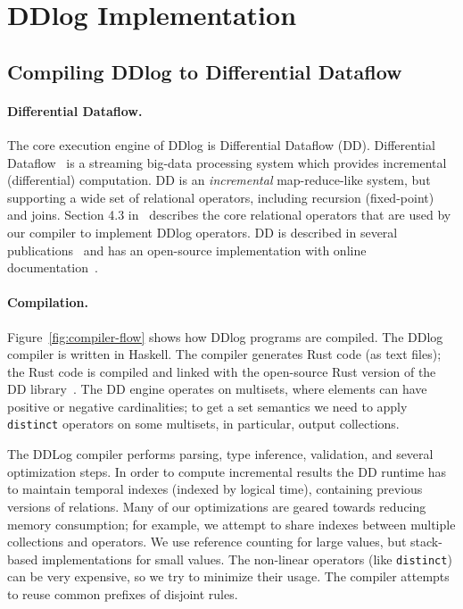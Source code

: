 \section{DDlog Implementation}\label{sec-system}

\subsection{Compiling DDlog to Differential Dataflow}

\paragraph{Differential Dataflow.}
The core execution engine of DDlog is Differential Dataflow (DD).
Differential Dataflow~\cite{differential-dataflow-paper} is a
streaming big-data processing system which provides incremental
(differential) computation.  DD is an \emph{incremental}
map-reduce-like system, but supporting a wide set of relational
operators, including recursion (fixed-point) and joins.  Section 4.3
in~\cite{differential-dataflow-paper} describes the core relational
operators that are used by our compiler to implement DDlog operators.
DD is described in several
publications~\cite{timely-dataflow,differential-dataflow-paper} and
has an open-source implementation with online
documentation~\cite{dd-mdbook,dd-reference}.

\paragraph{Compilation.}
Figure~\ref{fig:compiler-flow} shows how DDlog programs are compiled.
The DDlog compiler is written in Haskell.  The compiler generates Rust
code (as text files); the Rust code is compiled and linked with the
open-source Rust version of the DD
library~\cite{differential-dataflow}.  The DD engine operates on
multisets, where elements can have positive or negative cardinalities;
to get a set semantics we need to apply \texttt{distinct} operators on
some multisets, in particular, output collections.

The DDLog compiler performs parsing, type inference, validation, and
several optimization steps.  In order to compute incremental results
the DD runtime has to maintain temporal indexes (indexed by logical
time), containing previous versions of relations.  Many of our
optimizations are geared towards reducing memory consumption; for
example, we attempt to share indexes between multiple collections and
operators.  We use reference counting for large values, but
stack-based implementations for small values.  The non-linear
operators (like \texttt{distinct}) can be very expensive, so we try to
minimize their usage.  The compiler attempts to reuse common prefixes of
disjoint rules.

